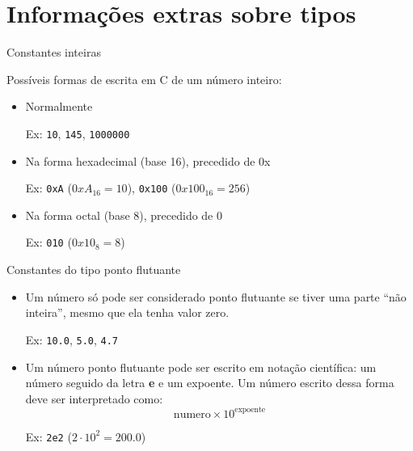 \documentclass[handout]{beamer}
\newcommand{\cod}[1]{\texttt{#1}}
\begin{document}

\section{Informações extras sobre tipos}

\begin{frame}[fragile]{Constantes inteiras}

    Possíveis formas de escrita em C de um número inteiro:

    \begin{itemize}[<+->]
        \item Normalmente

        Ex: \cod{10}, \cod{145}, \cod{1000000}

        \item Na forma hexadecimal (base 16), precedido de 0x

        Ex: \cod{0xA} ($0xA_{16} = 10$), \cod{0x100} ($0x100_{16} = 256$)

        \item Na forma octal (base 8), precedido de 0

        Ex: \cod{010} ($0x10_{8} = 8$)
    \end{itemize}
\end{frame}

\begin{frame}[fragile]{Constantes do tipo ponto flutuante}

    \begin{itemize}[<+->]
      \item Um número só pode ser considerado ponto flutuante se tiver uma parte ``não inteira'', mesmo que ela tenha valor zero.

      Ex: \cod{10.0}, \cod{5.0}, \cod{4.7}

      \item Um número ponto flutuante pode ser escrito em notação científica: um número seguido da letra {\bf e} e um expoente. Um número escrito dessa forma deve ser interpretado como: $$\mbox{numero} \times 10^{\mbox{expoente}}$$

      Ex: \cod{2e2} ($2 \cdot 10^2 = 200.0$)
    \end{itemize}
\end{frame}
\end{document}
